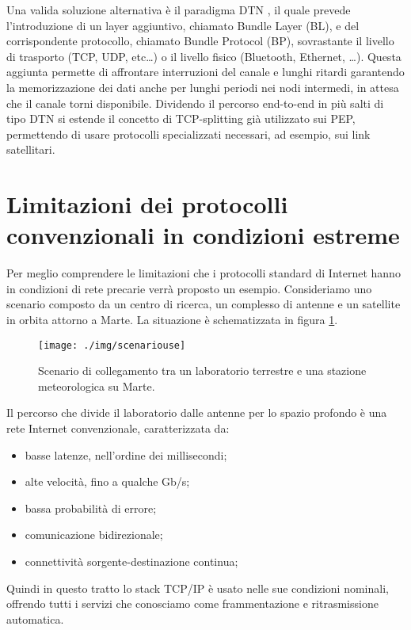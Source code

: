\documentclass[12pt,a4paper,oneside]{book}
\begin{document}
		Una valida soluzione alternativa è il paradigma DTN \cite{caini2011delay}, il quale prevede l'introduzione di un layer aggiuntivo, chiamato Bundle Layer (BL)\cite{cerf2007rfc}, e del corrispondente protocollo, chiamato Bundle Protocol (BP)\cite{scott2007bundle}, sovrastante il livello di trasporto (TCP, UDP, etc\dots) o il livello fisico (Bluetooth, Ethernet, \dots). Questa aggiunta permette di affrontare interruzioni del canale e lunghi ritardi garantendo la memorizzazione dei dati anche per lunghi periodi nei nodi intermedi, in attesa che il canale torni disponibile. Dividendo il percorso end-to-end in più salti di tipo DTN si estende il concetto di TCP-splitting già utilizzato sui PEP, permettendo di usare protocolli specializzati necessari, ad esempio, sui link satellitari.
		
		\section{Limitazioni dei protocolli convenzionali in condizioni estreme} \label{limProt}
		
		Per meglio comprendere le limitazioni che i protocolli standard di Internet hanno in condizioni di rete precarie verrà proposto un esempio. Consideriamo uno scenario composto da un centro di ricerca, un complesso di antenne e un satellite in orbita attorno a Marte. La situazione è schematizzata in figura \ref{fig:scenariomars}. 
		
		\begin{figure}[h]
			\centering
			\texttt{[image: ./img/scenariouse]}
			\caption{Scenario di collegamento tra un laboratorio terrestre e una stazione meteorologica su Marte.}
			\label{fig:scenariomars}
		\end{figure}
		
		Il percorso che divide il laboratorio dalle antenne per lo spazio profondo è una rete Internet convenzionale, caratterizzata da:
		\begin{itemize}
			\item basse latenze, nell'ordine dei millisecondi;
			\item alte velocità, fino a qualche Gb/s;
			\item bassa probabilità di errore;
			\item comunicazione bidirezionale;
			\item connettività sorgente-destinazione continua;
		\end{itemize}
		Quindi in questo tratto lo stack TCP/IP è usato nelle sue condizioni nominali, offrendo tutti i servizi che conosciamo come frammentazione e ritrasmissione automatica. 
		
\end{document}
